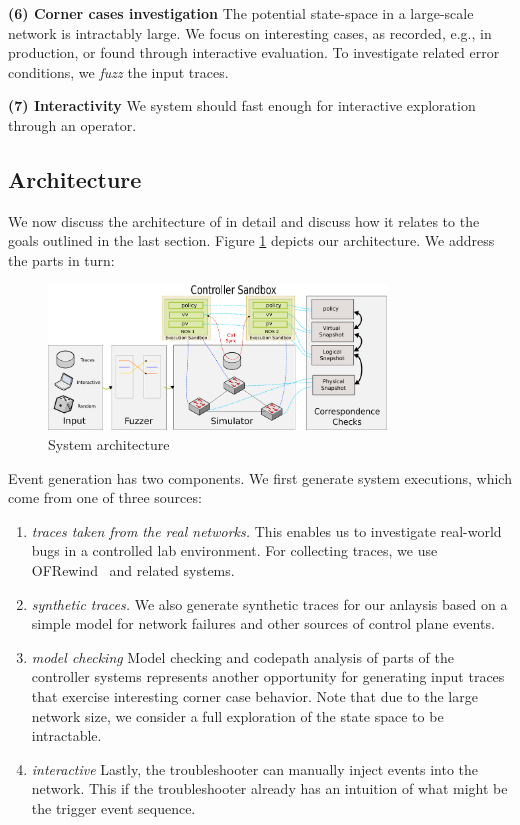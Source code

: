 \textbf{(6) Corner cases investigation} The potential state-space in a large-scale network
is intractably large. We focus on interesting cases, as recorded, e.g., in production, or
found through interactive evaluation. To investigate related error conditions,
we \emph{fuzz} the input traces.

\textbf{(7) Interactivity} We system should fast enough for interactive exploration through
an operator.

\subsection{Architecture}

We now discuss the architecture of \projectname in detail and discuss how it
relates to the goals outlined in the last section. Figure \ref{fig:system}
depicts our architecture. We address the parts in turn:

\begin{figure}[!t]
  \centering
  \includegraphics[width=0.8\textwidth]{../diagrams/architecture/architecture.pdf}
  \caption{System architecture}
  \label{fig:system}
\end{figure}

 Event generation has two components.
We first generate system executions, which come from one of three sources:
\begin{enumerate}
  \item \emph{traces taken from the real networks.} This enables us to investigate 
  real-world bugs in a controlled lab environment. For collecting traces,
  we use OFRewind~\cite{ofrewind} and related systems.
\item \emph{synthetic traces.} We also generate synthetic traces for our anlaysis
  based on a simple model for network failures and other sources of control plane
  events.
\item \emph{model checking} Model checking and codepath analysis of parts of the
  controller systems represents another opportunity for generating input traces
  that exercise interesting corner case behavior. Note that due to the large network
  size, we consider a full exploration of the state
  space to be intractable.
\item \emph{interactive} Lastly, the troubleshooter can manually inject events into
  the network. This if the troubleshooter already has an intuition of what might be
  the trigger event sequence.
\end{enumerate}

